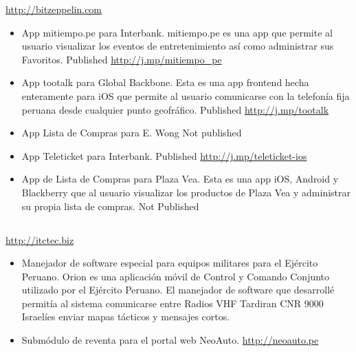 \documentclass[11pt,a4paper,english]{moderncv}
\begin{document}
{
\url{http://bitzeppelin.com}
\newline{}
\begin{itemize}
    \item App mitiempo.pe para Interbank. mitiempo.pe es una app que permite al usuario visualizar los eventos de entretenimiento así como administrar sus Favoritos.
        \newline{}
        Published \url{http://j.mp/mitiempo_pe}
        \newline{}
    \item App tootalk para Global Backbone. Esta es una app frontend hecha enteramente para iOS que permite al usuario comunicarse con la telefonía fija peruana desde cualquier punto geofráfico.
        \newline{}
        Published \url{http://j.mp/tootalk}
    \item App Lista de Compras para E. Wong
        \newline{}
        Not published
    \item App Teleticket para Interbank.
        \newline{}
        Published \url{http://j.mp/teleticket-ios}
    \item App de Lista de Compras para Plaza Vea. Esta es una app iOS, Android y Blackberry que al usuario visualizar los productos de Plaza Vea y administrar su propia lista de compras.
        \newline{}
        Not Published
\end{itemize}
}

\subsection{}

{
\url{http://itctec.biz}
\newline{}
\begin{itemize}
    \item Manejador de software especial para equipos militares para el Ejército Peruano.
        \newline{}
        Orion es una aplicación móvil de Control y Comando Conjunto utilizado por el Ejército Peruano. El manejador de software que desarrollé permitía al sistema comunicarse entre Radios VHF Tardiran CNR 9000 Israelíes enviar mapas tácticos y mensajes cortos.
    \item Submódulo de reventa para el portal web NeoAuto.
        \newline{}
        \url{http://neoauto.pe}
\end{itemize}
}
\end{document}
